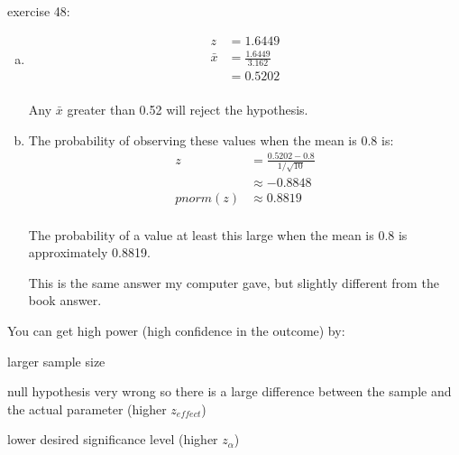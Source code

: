 \documentclass[letterpaper, landscape]{exam}
\begin{document}
  exercise 48:

  \begin{enumerate}[(a)]
    \item 
      \begin{align*}
        z       & = 1.6449 \\
        \bar{x} & = \frac{1.6449}{3.162} \\
                & = 0.5202 \\
      \end{align*}

      Any $\bar{x}$ greater than 0.52 will reject the hypothesis.

    \item The probability of observing these values when the mean is 0.8 is:
      \begin{align*}
        z        & = \frac{0.5202 - 0.8}{1/\sqrt{10}} \\
                 & \approx -0.8848 \\
        pnorm(z) & \approx 0.8819 \\
      \end{align*}

      The probability of a value at least this large when the mean is 0.8 is
      approximately 0.8819.

      This is the same answer my computer gave, but slightly different from the
      book answer. 

  \end{enumerate}


  You can get high power (high confidence in the outcome) by:
  \begin{itemize*}
    \item larger sample size
    \item null hypothesis very wrong so there is a large difference between the
      sample and the actual parameter (higher $z_{effect}$)
    \item lower desired significance level (higher $z_{\alpha}$)
  \end{itemize*}
\end{document}

